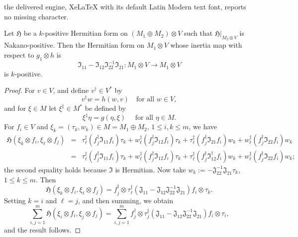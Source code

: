 \documentclass[10pt,a4paper]{amsart}
\newcommand{\fH}{{\mathfrak H}}
\newcommand{\fI}{\mathfrak{I}}
\newcommand{\fJ}{{\mathfrak J}}
\newcommand{\tensor}{\otimes}
\begin{document}
the delivered engine, XeLaTeX with its default Latin Modern text font, reports no missing character.
\begin{prop}\label{positivity-of-dets}
Let $\fH$ be a $k$-positive Hermitian form on $(M_1 \oplus M_2) \tensor V$ such that $\fH|_{M_2 \tensor V}$ is Nakano-positive.  Then the Hermitian form on $M_1 \tensor V$ whose inertia map with respect to $g_1 \tensor h$ is
\[
\fI _{11} - \fI_{12} \fI_{22}^{-1} \fI _{21} : M_1 \tensor V \to M_1 \tensor V
\]
is $k$-positive.
\end{prop}

\begin{proof}
For $v\in V$, and define $v^{\dagger} \in V^*$ by 
\[
v^\dagger w = h(w,v) \quad \text{for all }w \in V,
\]
and for $\xi \in M$ let $\xi^{\ddagger} \in M^*$ be defined by 
\[
\xi ^\ddagger \eta = g(\eta,\xi) \quad \text{ for all }\eta \in M.
\]
For $f_i \in V$ and $\xi_k= (\tau_k, w_k) \in M = M_1 \oplus M_2$, $1 \le i,k \le m$,  we have 
\begin{eqnarray*}
\fH (\xi _k \tensor f_i, \xi _{\ell} \tensor f_j) &=& \tau _{\ell} ^{\ddagger} \left (f_j ^{\dagger} \fI _{11} f_i\right ) \tau _k  +  w_{\ell} ^{\ddagger} \left (f_j ^{\dagger} \fI _{12} f_i\right ) \tau _k +  \tau_{\ell} ^{\ddagger} \left (f_j ^{\dagger} \fI _{21} f_i\right ) w _k +  w_{\ell} ^{\ddagger} \left (f_j ^{\dagger} \fI _{22} f_i\right ) w_k \\
&=& \tau _{\ell} ^{\ddagger} \left (f_j ^{\dagger} \fI _{11} f_i\right ) \tau _k  +  w_{\ell} ^{\ddagger} \left (f_j ^{\dagger} \fI _{12} f_i\right ) \tau _k +  \tau_{\ell} ^{\ddagger} \left (f_j ^{\dagger} \fI _{12}^{\dagger} f_i\right ) w _k +  w_{\ell} ^{\ddagger} \left (f_j ^{\dagger} \fI _{22} f_i\right ) w_k;
\end{eqnarray*}
the second equality holds because $\fI$ is Hermitian.  Now take $w_k := - \fJ_{22} ^{-1} \fJ_{21} \tau _k$, $1 \le k \le m$.  Then 
\[
\fH (\xi _k \tensor f_i,\xi _{\ell} \tensor f_j) = f_j^{\dagger} \tensor \tau _{\ell} ^{\ddagger} \left ( \fJ _{11} - \fJ_{12} \fJ_{22} ^{-1} \fJ_{21} \right ) f_i \tensor \tau _k.
\]
Setting $k=i$ and $\ell = j$, and then summing, we obtain 
\[
\sum _{i,j=1} ^m \fH (\xi _i \tensor f_i,\xi _{j} \tensor f_j)= \sum _{i,j=1} ^m f_j^{\dagger} \tensor \tau _{j} ^{\ddagger} \left ( \fJ _{11} - \fJ_{12} \fJ_{22} ^{-1} \fJ_{21} \right ) f_i \tensor \tau _i,
\]
and the result follows.
\end{proof}
\end{document}

